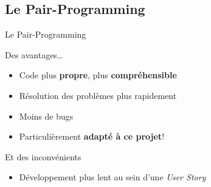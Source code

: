 \FlorentSpeak
\subsection{Le Pair-Programming}
\begin{frame}{Le Pair-Programming}
	\pause
	\begin{exampleblock}{Des avantages…}
		\begin{itemize}
			\item Code plus \textbf{propre}, plus \textbf{compréhensible}
			\item Résolution des problèmes plus rapidement
			\item Moins de bugs
			\item Particulièrement \textbf{adapté à ce projet}!
		\end{itemize}
	\end{exampleblock}
	\pause
	\vfill
	\begin{alertblock}{Et des inconvénients}
		\begin{itemize}
			\item Développement plus lent au sein d'une \textit{User Story}
		\end{itemize}
	\end{alertblock}
\end{frame}
	
